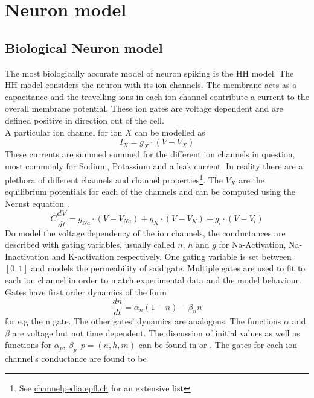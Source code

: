 \section{Neuron model}

\subsection{Biological Neuron model}
The most biologically accurate model of neuron spiking is the \ac{HH} model. The \ac{HH}-model considers the neuron with its ion channels. The membrane acts as a capacitance and the travelling ions in each ion channel contribute a current to the overall membrane potential. These ion gates are voltage dependent and are defined positive in direction out of the cell.\\
A particular ion channel for ion $X$ can be modelled as
\begin{equation}
	I_X= g_X \cdot (V-V_X)
\end{equation}
These currents are summed summed for the different ion channels in question, most commonly for Sodium, Potassium and a leak current. In reality there are a plethora of different channels and channel properties\footnote{See  \url{channelpedia.epfl.ch} for an extensive list}. The $V_X$ are the equilibrium potentials for each of the channels and can be computed using the Nernst equation \cite{johnston_foundations_1995}. 
\begin{equation}
	C \frac{dV}{dt} = g_{Na} \cdot (V-V_{Na}) + g_K \cdot (V-V_K) + g_l \cdot (V-V_l)
\end{equation}
Do model the voltage dependency of the ion channels, the conductances are described with gating variables, usually called $n$, $h$ and $g$ for Na-Activation, Na-Inactivation and K-activation respectively. One gating variable is set between $[0,1]$ and models the permeability of said gate. Multiple gates are used to fit to each ion channel in order to match experimental data and the model behaviour.\\
Gates have first order dynamics of the form
\begin{equation}
	\frac{dn}{dt} = \alpha_n(1-n) - \beta_n n
\end{equation}
for e.g the n gate. The other gates' dynamics are analogous. The functions $\alpha$ and $\beta$ are voltage but not time dependent. The discussion of initial values as well as functions for $\alpha_p,\ \beta_p\ \ p = (n,h,m)$ can be found in \cite{hodgkin_quantitative_1952} or \cite{johnston_foundations_1995}. The gates for each ion channel's conductance are found to be
